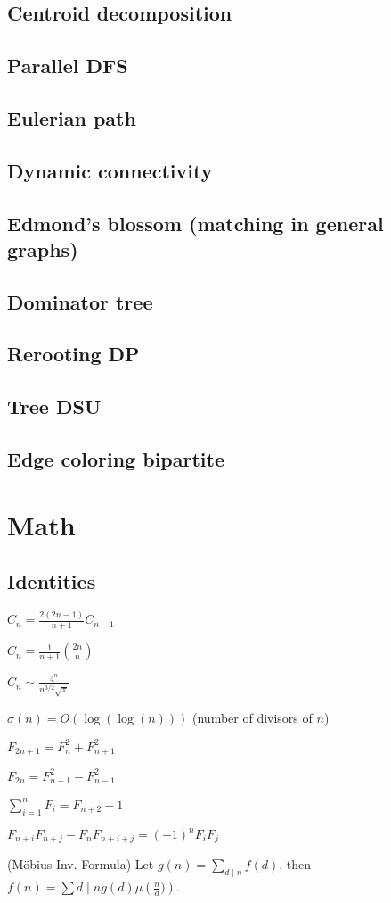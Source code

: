 \subsection{Centroid decomposition}
\subsection{Parallel DFS}
\subsection{Eulerian path}
\subsection{Dynamic connectivity}
\subsection{Edmond's blossom (matching in general graphs)}
\subsection{Dominator tree}
\subsection{Rerooting DP}
\subsection{Tree DSU}
\subsection{Edge coloring bipartite}

\section{Math}
\subsection{Identities}
{
	$C_n = \frac{2(2n-1)}{n+1} C_{n-1}$

	$C_n = \frac{1}{n+1} \binom{2n}{n}$

	$C_n \sim \frac{4^n}{n^{3/2}\sqrt{\pi}}$

	$\sigma(n) = O(\log(\log(n)))$ (number of divisors of $n$)

	$F_{2n+1} = F_{n}^2 + F_{n+1}^2$

	$F_{2n} = F_{n+1}^2 - F_{n-1}^2$

	$\sum_{i=1}^n F_i = F_{n+2}-1$

	$F_{n+i}F_{n+j} - F_nF_{n+i+j} = (-1)^n F_iF_j$

	(Möbius Inv. Formula)
	Let $g(n) = \sum_{d\mid n} f(d)$, then $f(n)=\sum{d\mid n} g(d) \mu\left(\frac{n}{d})\right)$.
}
